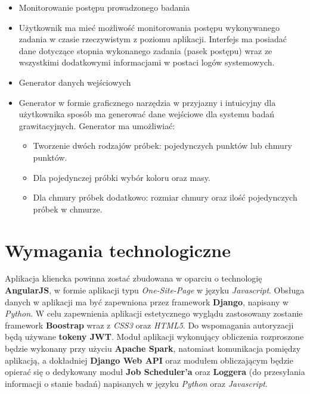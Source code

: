 \documentclass[a4paper,onecolumn,oneside,12pt]{memoir}
\begin{document}
{\begin{itemize}\bfseries
\item Monitorowanie postępu prowadzonego badania
\end{itemize}
\begin{itemize}
\item[] Użytkownik ma mieć możliwość monitorowania postępu wykonywanego zadania w czasie rzeczywistym z poziomu aplikacji. Interfejs ma posiadać dane dotyczące stopnia wykonanego zadania (pasek postępu) wraz ze wszystkimi dodatkowymi informacjami w postaci logów systemowych.
\end{itemize}


\begin{itemize}\bfseries
\item Generator danych wejściowych
\end{itemize}
\begin{itemize}
\item[] Generator w formie graficznego narzędzia w przyjazny i intuicyjny dla użytkownika sposób ma generować dane wejściowe dla systemu badań grawitacyjnych. Generator ma umożliwiać:
\begin{itemize}
\item Tworzenie dwóch rodzajów próbek: pojedynczych punktów lub chmury punktów.
\item Dla pojedynczej próbki wybór koloru oraz masy.
\item Dla chmury próbek dodatkowo: rozmiar chmury oraz ilość pojedynczych próbek w chmurze.

\end{itemize}
\end{itemize}

\section{Wymagania technologiczne}

	Aplikacja kliencka powinna zostać zbudowana w oparciu o technologię \textbf{AngularJS}, w formie aplikacji typu \textit{One-Site-Page} w języku \textit{Javascript}. Obsługa danych w aplikacji ma być zapewniona przez framework \textbf{Django}, napisany w \textit{Python}. W celu zapewnienia aplikacji estetycznego wyglądu zastosowany zostanie framework \textbf{Boostrap} wraz z \textit{CSS3} oraz \textit{HTML5}. Do wspomagania autoryzacji będą używane \textbf{tokeny JWT}. Moduł aplikacji wykonujący obliczenia rozproszone będzie wykonany przy użyciu \textbf{Apache Spark}, natomiast komunikacja pomiędzy aplikacją, a dokładniej \textbf{Django Web API} oraz modułem obliczającym będzie opierać się o dedykowany moduł \textbf{Job Scheduler'a} oraz \textbf{Loggera} (do przesyłania informacji o stanie badań) napisanych w języku \textit{Python} oraz \textit{Javascript}.



}
\end{document}
